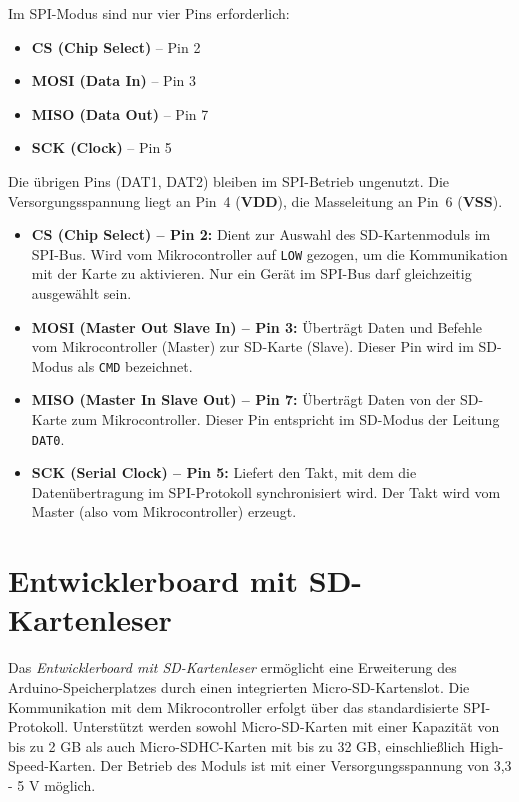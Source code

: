 Im SPI-Modus sind nur vier Pins erforderlich:
\begin{itemize}
    \item \textbf{CS (Chip Select)} – Pin 2
    \item \textbf{MOSI (Data In)} – Pin 3
    \item \textbf{MISO (Data Out)} – Pin 7
    \item \textbf{SCK (Clock)} – Pin 5
\end{itemize}

Die übrigen Pins (DAT1, DAT2) bleiben im SPI-Betrieb ungenutzt. Die Versorgungsspannung liegt an Pin~4 (\textbf{VDD}), die Masseleitung an Pin~6 (\textbf{VSS}).


\begin{itemize}
    \item \textbf{CS (Chip Select) – Pin 2:}  
    Dient zur Auswahl des SD-Kartenmoduls im SPI-Bus. Wird vom Mikrocontroller auf \texttt{LOW} gezogen, um die Kommunikation mit der Karte zu aktivieren. Nur ein Gerät im SPI-Bus darf gleichzeitig ausgewählt sein.
    
    \item \textbf{MOSI (Master Out Slave In) – Pin 3:}  
    Überträgt Daten und Befehle vom Mikrocontroller (Master) zur SD-Karte (Slave). Dieser Pin wird im SD-Modus als \texttt{CMD} bezeichnet.
    
    \item \textbf{MISO (Master In Slave Out) – Pin 7:}  
    Überträgt Daten von der SD-Karte zum Mikrocontroller. Dieser Pin entspricht im SD-Modus der Leitung \texttt{DAT0}.
    
    \item \textbf{SCK (Serial Clock) – Pin 5:}  
    Liefert den Takt, mit dem die Datenübertragung im SPI-Protokoll synchronisiert wird. Der Takt wird vom Master (also vom Mikrocontroller) erzeugt.
\end{itemize}


\section{Entwicklerboard mit SD-Kartenleser}

Das \textit{Entwicklerboard mit SD-Kartenleser} \cite{AZDelivery.2024} ermöglicht eine Erweiterung des Arduino-Speicherplatzes durch einen integrierten Micro-SD-Kartenslot. Die Kommunikation mit dem Mikrocontroller erfolgt über das standardisierte SPI-Protokoll. Unterstützt werden sowohl Micro-SD-Karten mit einer Kapazität von bis zu 2 GB als auch Micro-SDHC-Karten mit bis zu 32 GB, einschließlich High-Speed-Karten. Der Betrieb des Moduls ist mit einer Versorgungsspannung von 3,3 - 5 V möglich.

